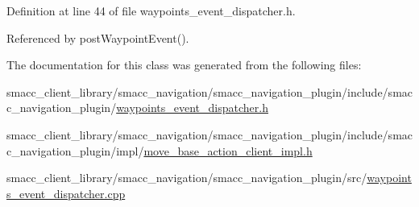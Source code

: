 Definition at line 44 of file waypoints\+\_\+event\+\_\+dispatcher.\+h.



Referenced by post\+Waypoint\+Event().



The documentation for this class was generated from the following files\+:\begin{DoxyCompactItemize}
\item 
smacc\+\_\+client\+\_\+library/smacc\+\_\+navigation/smacc\+\_\+navigation\+\_\+plugin/include/smacc\+\_\+navigation\+\_\+plugin/\hyperlink{waypoints__event__dispatcher_8h}{waypoints\+\_\+event\+\_\+dispatcher.\+h}\item 
smacc\+\_\+client\+\_\+library/smacc\+\_\+navigation/smacc\+\_\+navigation\+\_\+plugin/include/smacc\+\_\+navigation\+\_\+plugin/impl/\hyperlink{move__base__action__client__impl_8h}{move\+\_\+base\+\_\+action\+\_\+client\+\_\+impl.\+h}\item 
smacc\+\_\+client\+\_\+library/smacc\+\_\+navigation/smacc\+\_\+navigation\+\_\+plugin/src/\hyperlink{waypoints__event__dispatcher_8cpp}{waypoints\+\_\+event\+\_\+dispatcher.\+cpp}\end{DoxyCompactItemize}
